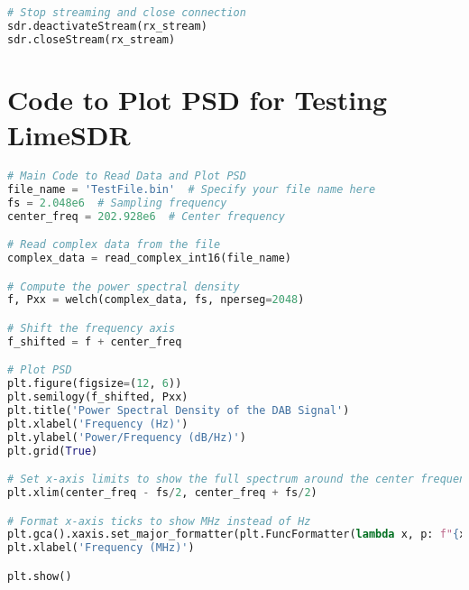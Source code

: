 \begin{appendices}
\begin{lstlisting}[language=Python, caption={Python code for capturing DAB signal using LimeSDR}, label={lst:limeSDR_code}]
# Stop streaming and close connection
sdr.deactivateStream(rx_stream)
sdr.closeStream(rx_stream)
\end{lstlisting}


\section{Code to Plot PSD for Testing LimeSDR}

\begin{lstlisting}[language=Python, caption={Main Code to Read Data and Plot PSD}, label={lst:main_code}]
# Main Code to Read Data and Plot PSD
file_name = 'TestFile.bin'  # Specify your file name here
fs = 2.048e6  # Sampling frequency
center_freq = 202.928e6  # Center frequency

# Read complex data from the file
complex_data = read_complex_int16(file_name)

# Compute the power spectral density
f, Pxx = welch(complex_data, fs, nperseg=2048)

# Shift the frequency axis
f_shifted = f + center_freq

# Plot PSD
plt.figure(figsize=(12, 6))
plt.semilogy(f_shifted, Pxx)
plt.title('Power Spectral Density of the DAB Signal')
plt.xlabel('Frequency (Hz)')
plt.ylabel('Power/Frequency (dB/Hz)')
plt.grid(True)

# Set x-axis limits to show the full spectrum around the center frequency
plt.xlim(center_freq - fs/2, center_freq + fs/2)

# Format x-axis ticks to show MHz instead of Hz
plt.gca().xaxis.set_major_formatter(plt.FuncFormatter(lambda x, p: f"{x/1e6:.3f}"))
plt.xlabel('Frequency (MHz)')

plt.show()
\end{lstlisting}

\end{appendices}